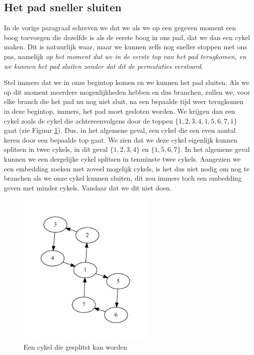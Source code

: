 \documentclass{article}
\begin{document}
\subsection{Het pad sneller sluiten}
\label{sluit-pad-sneller}
In de vorige paragraaf schreven we dat we als we op een gegeven moment een boog
toevoegen die dezelfde is als de eerste boog in ons pad, dat we dan een cykel
maken. Dit is natuurlijk waar, maar we kunnen zelfs nog sneller stoppen met ons
pas, namelijk \emph{op het moment dat we in de eerste top van het pad
terugkomen, en we kunnen het pad sluiten zonder dat dit de permutaties
verstoord}.
\newline

Stel immers dat we in onze begintop komen en we kunnen het pad sluiten. Als
we op dit moment meerdere mogenlijkheden hebben en dus branchen, zullen we,
voor elke branch die het pad nu nog niet sluit, na een bepaalde tijd weer
terugkomen in deze begintop, immers, het pad moet gesloten worden. We krijgen
dan een cykel zoals de cykel die achtereenvolgens door de toppen
$\{1, 2, 3, 4, 1, 5, 6, 7, 1\}$ gaat (zie Figuur \ref{fig:octo}). Dus, in het
algemene geval, een cykel die een even aantal keren door een bepaalde top gaat.
We zien dat we deze cykel eigenlijk kunnen splitsen in twee cykels,
in dit geval $\{1, 2, 3, 4\}$ en $\{1, 5, 6, 7\}$. In het algemene geval kunnen
we een dergelijke cykel splitsen in tenminste twee cykels. Aangezien we een
embedding zoeken met zoveel mogelijk cykels, is het dus niet nodig om nog te
branchen als we onze cykel kunnen sluiten, dit zou immers toch een embedding
geven met minder cykels. Vandaar dat we dit niet doen.

\begin{figure}
\begin{center}
\includegraphics[width=0.6\textwidth]{images/octo.pdf}
\caption{Een cykel die gesplitst kan worden}
\label{fig:octo}
\end{center}
\end{figure}
\end{document}
